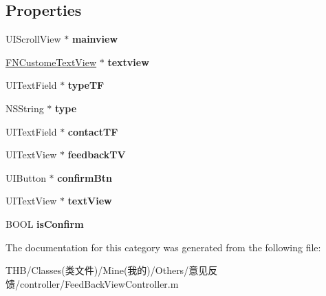 \subsection*{Properties}
\begin{DoxyCompactItemize}
\item 
\mbox{\label{category_feed_back_view_controller_07_08_ad627316ca2cd238742daf57ffb1ffc25}} 
U\+I\+Scroll\+View $\ast$ {\bfseries mainview}
\item 
\mbox{\label{category_feed_back_view_controller_07_08_a95f5df132aa0c1cc41a332092dcf243f}} 
\mbox{\hyperlink{interface_f_n_custome_text_view}{F\+N\+Custome\+Text\+View}} $\ast$ {\bfseries textview}
\item 
\mbox{\label{category_feed_back_view_controller_07_08_abc64511a4a5b6cbbd98a923e6eb6bf17}} 
U\+I\+Text\+Field $\ast$ {\bfseries type\+TF}
\item 
\mbox{\label{category_feed_back_view_controller_07_08_a53f86243933261ce4af9cd33f71024e4}} 
N\+S\+String $\ast$ {\bfseries type}
\item 
\mbox{\label{category_feed_back_view_controller_07_08_ac6dd502412a1aa2af3b98313092b8b5b}} 
U\+I\+Text\+Field $\ast$ {\bfseries contact\+TF}
\item 
\mbox{\label{category_feed_back_view_controller_07_08_a99b05e8e3f1ef6a3fb533e9073b170df}} 
U\+I\+Text\+View $\ast$ {\bfseries feedback\+TV}
\item 
\mbox{\label{category_feed_back_view_controller_07_08_a6d19d61cd8c07c541d5930c6c4a9aa0f}} 
U\+I\+Button $\ast$ {\bfseries confirm\+Btn}
\item 
\mbox{\label{category_feed_back_view_controller_07_08_a13e86fa4d644ee83d78da6ef0e16fc21}} 
U\+I\+Text\+View $\ast$ {\bfseries text\+View}
\item 
\mbox{\label{category_feed_back_view_controller_07_08_a6b6256f650f8e4a682ada01d600d10a7}} 
B\+O\+OL {\bfseries is\+Confirm}
\end{DoxyCompactItemize}


The documentation for this category was generated from the following file\+:\begin{DoxyCompactItemize}
\item 
T\+H\+B/\+Classes(类文件)/\+Mine(我的)/\+Others/意见反馈/controller/Feed\+Back\+View\+Controller.\+m\end{DoxyCompactItemize}
